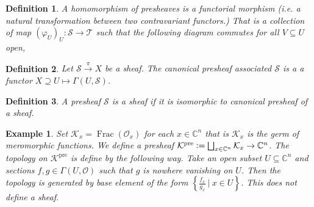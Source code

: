 \documentclass{article}
\newtheorem{definition}{Definition}[section]
\newtheorem{example}{Example}[section]
\DeclareMathOperator{\pre}{pre}
\DeclareMathOperator{\Frac}{Frac}
\newcommand{\defeq}{\vcentcolon=}
\newcommand{\C}[0]{\mathbb{C}}
\newcommand{\sep}[0]{\:|\:}
\newcommand{\Ouv}[0]{\mathcal{O}}
\begin{document}
  \begin{definition}
    A homomorphism of presheaves is a functorial morphism (i.e. a natural transformation between two contravariant functors.) That is a collection of map $(\varphi_U)_U:\mathcal{S}\to\mathcal{T}$ such that the following diagram commutes for all $V\subseteq U$ open,
    \begin{center}
    \end{center}
  \end{definition}

\begin{definition}
  Let $\mathcal{S}\stackrel{\pi}{\to} X$ be a sheaf. The canonical presheaf associated $\mathcal{S}$ is a a functor $X\supseteq U\mapsto \Gamma(U,\mathcal{S})$.
\end{definition}


\begin{definition}
  A presheaf $\mathcal{S}$ is a sheaf if it is isomorphic to canonical presheaf of a sheaf.
\end{definition}

\begin{example}
  Set $\mathcal{K}_x = \Frac(\Ouv_x)$ for each $x\in\C^n$ that is $\mathcal{K}_x$ is the germ of meromorphic functions. We define a presheaf $\mathcal{K}^{\pre}\defeq\bigsqcup_{x\in \C^n}\mathcal{K}_x\to\C^n$. The topology on $\mathcal{K}^{\pre}$ is define by the following way. Take an open subset $U\subseteq\C^n$ and sections $f,g\in\Gamma(U,\Ouv)$ such that $g$ is nowhere vanishing on $U$. Then the topology is generated by base element of the form $\left\{{\frac {f_x} {g_x}}\sep x\in U\right\}$. This does not define a sheaf.
\end{example}
\end{document}
